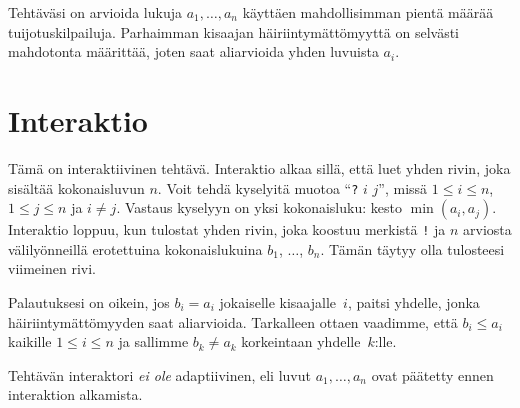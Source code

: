 Tehtäväsi on arvioida lukuja $a_1,\ldots, a_n$ käyttäen mahdollisimman pientä 
määrää tuijotuskilpailuja.
Parhaimman kisaajan häiriintymättömyyttä on selvästi mahdotonta määrittää, joten 
saat aliarvioida yhden luvuista $a_i$.

\section*{Interaktio}

Tämä on interaktiivinen tehtävä.
Interaktio alkaa sillä, että luet yhden rivin, joka sisältää kokonaisluvun $n$.
Voit tehdä kyselyitä muotoa ``\texttt{?} $i$ $j$'', missä 
$1\leq i\leq n$, $1\leq j\leq n$ ja $i\neq j$.
Vastaus kyselyyn on yksi kokonaisluku: kesto $\min(a_i, a_j)$.
Interaktio loppuu, kun tulostat yhden rivin, joka koostuu merkistä \texttt{!} 
ja $n$ arviosta välilyönneillä erotettuina kokonaislukuina 
$b_1$, $\ldots$, $b_n$.
Tämän täytyy olla tulosteesi viimeinen rivi.

Palautuksesi on oikein, jos $b_i=a_i$ jokaiselle kisaajalle~$i$, paitsi yhdelle,
jonka häiriintymättömyyden saat a\-li\-ar\-vi\-oi\-da.
Tarkalleen ottaen vaadimme, että $b_i\leq a_i$ kaikille $1\leq i\leq n$  
ja sallimme $b_k \neq a_k$ korkeintaan yhdelle~$k$:lle.

Tehtävän interaktori \emph{ei ole} adaptiivinen, eli luvut $a_1,\ldots, a_n$ 
ovat päätetty ennen interaktion alkamista.


